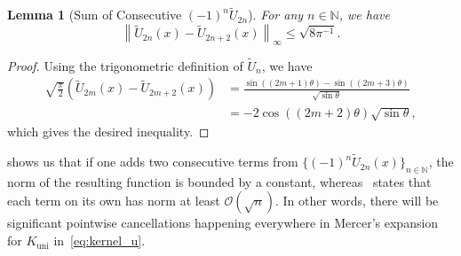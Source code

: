 \documentclass{article}
\newtheorem{lemma}{Lemma}
\begin{document}
\begin{lemma}[Sum of Consecutive $(-1)^n\tilde{U}_{2n}$]\label{lem:sumofU2n}
For any $n\in\mathbb{N}$, we have
\begin{equation*}
\left\|\tilde{U}_{2n}(x) - \tilde{U}_{2n+2}(x)\right\|_\infty \leq \sqrt{8\pi^{-1}}.
\end{equation*}
\end{lemma}
\begin{proof}
Using the trigonometric definition of $\tilde{U}_n$, we have
\begin{align*}
    \sqrt{\frac{\pi}{2}}\left(\tilde{U}_{2m}(x)-\tilde{U}_{2m+2}(x)\right) &= \frac{\sin((2m+1)\theta) - \sin((2m+3)\theta)}{\sqrt{\sin \theta}}\\
    &= -2\cos((2m+2)\theta)\sqrt{\sin \theta},
\end{align*}
which gives the desired inequality. 
\end{proof}
 shows us that if one adds two consecutive terms from $\{(-1)^n\tilde{U}_{2n}(x)\}_{n\in\mathbb{N}}$, the norm of the resulting function is bounded by a constant, whereas~ states that each term on its own has norm at least $\mathcal{O}(\sqrt{n})$. In other words, there will be significant pointwise cancellations happening everywhere in Mercer's expansion for $K_{\text{uni}}$ in~\cref{eq:kernel_u}. 
\end{document}
